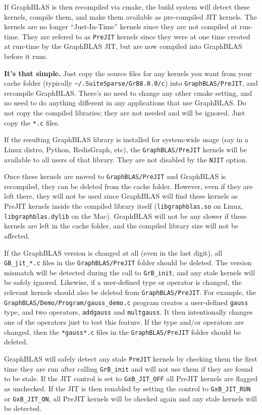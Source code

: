 \documentclass[12pt]{article}
\begin{document}
If GraphBLAS is then recompiled via cmake, the build system will detect these
kernels, compile them, and make them available as pre-compiled JIT kernels.
The kernels are no longer ``Just-In-Time'' kernels since they are not compiled
at run-time.  They are refered to as \verb'PreJIT' kernels since they were at
one time created at run-time by the GraphBLAS JIT, but are now compiled into
GraphBLAS before it runs.

{\bf It's that simple.}  Just copy the source files for any kernels you want
from your cache folder (typically \verb'~/.SuiteSparse/GrB8.0.0/c') into
\verb'GraphBLAS/PreJIT', and recompile GraphBLAS.  There's no need to change
any other cmake setting, and no need to do anything different in any
applications that use GraphBLAS.  Do not copy the compiled libraries; they are
not needed and will be ignored.  Just copy the \verb'*.c' files.

If the resulting GraphBLAS library is installed for system-wide usage (say in a
Linux distro, Python, RedisGraph, etc), the \verb'GraphBLAS/PreJIT' kernels
will be available to all users of that library.  They are not disabled by the
\verb'NJIT' option.

Once these kernels are moved to \verb'GraphBLAS/PreJIT' and GraphBLAS is
recompiled, they can be deleted from the cache folder.  However, even if they
are left there, they will not be used since GraphBLAS will find these kernels
as PreJIT kernels inside the compiled library itself (\verb'libgraphblas.so' on
Linux, \verb'libgraphblas.dylib' on the Mac).  GraphBLAS will not be any slower
if these kernels are left in the cache folder, and the compiled library size
will not be affected.

If the GraphBLAS version is changed at all (even in the last digit), all
\verb'GB_jit_*.c' files in the \verb'GraphBLAS/PreJIT' folder should be
deleted.  The version mismatch will be detected during the call to
\verb'GrB_init', and any stale kernels will be safely ignored.  Likewise, if a
user-defined type or operator is changed, the relevant kernels should also be
deleted from \verb'GraphBLAS/PreJIT'.  For example, the
\verb'GraphBLAS/Demo/Program/gauss_demo.c' program creates a user-defined
\verb'gauss' type, and two operators, \verb'addgauss' and \verb'multgauss'.  It
then intentionally changes one of the operators just to test this feature.  If
the type and/or operators are changed, then the \verb'*gauss*.c' files in the
\verb'GraphBLAS/PreJIT' folder should be deleted.

GraphBLAS will safely detect any stale \verb'PreJIT' kernels by checking them
the first time they are run after calling \verb'GrB_init' and will not use them
if they are found to be stale.  If the JIT control is set to \verb'GxB_JIT_OFF'
all PreJIT kernels are flagged as unchecked.  If the JIT is then renabled by
setting the control to \verb'GxB_JIT_RUN' or \verb'GxB_JIT_ON', all PreJIT
kernels will be checked again and any stale kernels will be detected.
\end{document}
